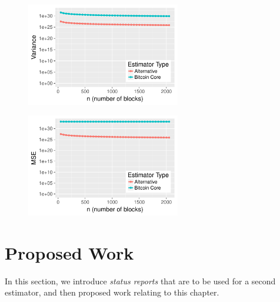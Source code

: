 \begin{figure}\begin{center}
	\includegraphics[width=0.6\textwidth]{graphs/variance}
	\caption{
	\label{fig:variance}}
\end{center}\end{figure}

\begin{figure}\begin{center}
	\includegraphics[width=0.6\textwidth]{graphs/MSE}
	\caption{
	\label{fig:MSE}}
\end{center}\end{figure}


\section{Proposed Work} \label{section:difficulty-proposed-work}
In this section, we introduce \textit{status reports} that are to be used for a second estimator, and then proposed work relating to this chapter.

